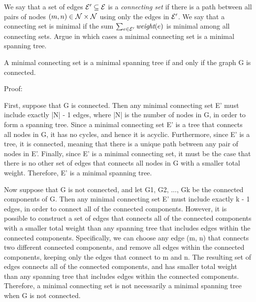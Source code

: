 \begin{problem}
\begin{questions}
\item We say that a set of edges $\mathcal{E}' \subseteq \mathcal{E}$ is a \emph{connecting set} if there is a path between all pairs of nodes $(m, n) \in \mathcal{N}\times\mathcal{N}$ using only the edges in $\mathcal{E}'$. We say that a connecting set is minimal if the sum $\sum_{e \in \mathcal{E}'} \mathord{\textit{weight}}(e)$ is minimal among all connecting sets. Argue in which cases a minimal connecting set is a minimal spanning tree.

A minimal connecting set is a minimal spanning tree if and only if the graph G is connected.

Proof:

First, suppose that G is connected. Then any minimal connecting set E' must include exactly |N| - 1 edges, where |N| is the number of nodes in G, in order to form a spanning tree. Since a minimal connecting set E' is a tree that connects all nodes in G, it has no cycles, and hence it is acyclic. Furthermore, since E' is a tree, it is connected, meaning that there is a unique path between any pair of nodes in E'. Finally, since E' is a minimal connecting set, it must be the case that there is no other set of edges that connects all nodes in G with a smaller total weight. Therefore, E' is a minimal spanning tree.

Now suppose that G is not connected, and let G1, G2, ..., Gk be the connected components of G. Then any minimal connecting set E' must include exactly k - 1 edges, in order to connect all of the connected components. However, it is possible to construct a set of edges that connects all of the connected components with a smaller total weight than any spanning tree that includes edges within the connected components. Specifically, we can choose any edge (m, n) that connects two different connected components, and remove all edges within the connected components, keeping only the edges that connect to m and n. The resulting set of edges connects all of the connected components, and has smaller total weight than any spanning tree that includes edges within the connected components. Therefore, a minimal connecting set is not necessarily a minimal spanning tree when G is not connected.


\end{questions}
\end{problem}

